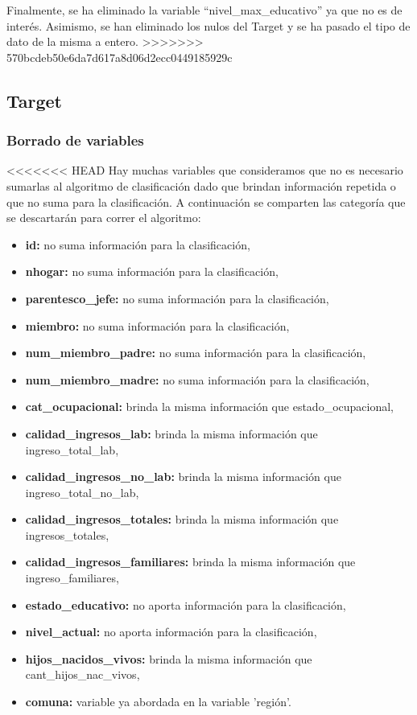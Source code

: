 \documentclass[a4paper]{article}
\begin{document}
        Finalmente, se ha eliminado la variable ``nivel\_max\_educativo'' ya que no es de interés. Asimismo, se han eliminado los nulos del Target y se ha pasado el tipo de dato de la misma a entero. 
>>>>>>> 570bcdeb50e6da7d617a8d06d2ecc0449185929c
        

    \subsection{Target}

        \subsubsection{Borrado de variables}
    
<<<<<<< HEAD
        Hay muchas variables que consideramos que no es necesario sumarlas al algoritmo de clasificación dado que brindan información repetida o que no suma para la clasificación. A continuación se comparten las categoría que se descartarán para correr el algoritmo: 
        \begin{itemize}
            \item \textbf{id:} no suma información para la clasificación,
            \item \textbf{nhogar:} no suma información para la clasificación,
            \item \textbf{parentesco\_jefe:} no suma información para la clasificación,
            \item \textbf{miembro:} no suma información para la clasificación,
            \item \textbf{num\_miembro\_padre:} no suma información para la clasificación,
            \item \textbf{num\_miembro\_madre:} no suma información para la clasificación,
            \item \textbf{cat\_ocupacional:} brinda la misma información que estado\_ocupacional,
            \item \textbf{calidad\_ingresos\_lab:} brinda la misma información que ingreso\_total\_lab,
            \item \textbf{calidad\_ingresos\_no\_lab:} brinda la misma información que ingreso\_total\_no\_lab,
            \item \textbf{calidad\_ingresos\_totales:} brinda la misma información que ingresos\_totales,
            \item \textbf{calidad\_ingresos\_familiares:} brinda la misma información que ingreso\_familiares,
            \item \textbf{estado\_educativo:} no aporta información para la clasificación,
            \item \textbf{nivel\_actual:} no aporta información para la clasificación,
            \item \textbf{hijos\_nacidos\_vivos:} brinda la misma información que cant\_hijos\_nac\_vivos,
            \item \textbf{comuna:} variable ya abordada en la variable 'región'.
        \end{itemize}
\end{document}
